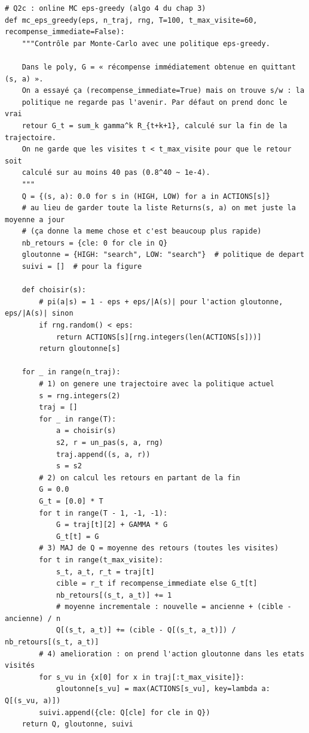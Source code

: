 \documentclass[11pt,a4paper]{article}
\begin{document}
\begin{lstlisting}[firstnumber=163]
# Q2c : online MC eps-greedy (algo 4 du chap 3)
def mc_eps_greedy(eps, n_traj, rng, T=100, t_max_visite=60, recompense_immediate=False):
    """Contrôle par Monte-Carlo avec une politique eps-greedy.

    Dans le poly, G = « récompense immédiatement obtenue en quittant (s, a) ».
    On a essayé ça (recompense_immediate=True) mais on trouve s/w : la
    politique ne regarde pas l'avenir. Par défaut on prend donc le vrai
    retour G_t = sum_k gamma^k R_{t+k+1}, calculé sur la fin de la trajectoire.
    On ne garde que les visites t < t_max_visite pour que le retour soit
    calculé sur au moins 40 pas (0.8^40 ~ 1e-4).
    """
    Q = {(s, a): 0.0 for s in (HIGH, LOW) for a in ACTIONS[s]}
    # au lieu de garder toute la liste Returns(s, a) on met juste la moyenne a jour
    # (ça donne la meme chose et c'est beaucoup plus rapide)
    nb_retours = {cle: 0 for cle in Q}
    gloutonne = {HIGH: "search", LOW: "search"}  # politique de depart
    suivi = []  # pour la figure

    def choisir(s):
        # pi(a|s) = 1 - eps + eps/|A(s)| pour l'action gloutonne, eps/|A(s)| sinon
        if rng.random() < eps:
            return ACTIONS[s][rng.integers(len(ACTIONS[s]))]
        return gloutonne[s]

    for _ in range(n_traj):
        # 1) on genere une trajectoire avec la politique actuel
        s = rng.integers(2)
        traj = []
        for _ in range(T):
            a = choisir(s)
            s2, r = un_pas(s, a, rng)
            traj.append((s, a, r))
            s = s2
        # 2) on calcul les retours en partant de la fin
        G = 0.0
        G_t = [0.0] * T
        for t in range(T - 1, -1, -1):
            G = traj[t][2] + GAMMA * G
            G_t[t] = G
        # 3) MAJ de Q = moyenne des retours (toutes les visites)
        for t in range(t_max_visite):
            s_t, a_t, r_t = traj[t]
            cible = r_t if recompense_immediate else G_t[t]
            nb_retours[(s_t, a_t)] += 1
            # moyenne incrementale : nouvelle = ancienne + (cible - ancienne) / n
            Q[(s_t, a_t)] += (cible - Q[(s_t, a_t)]) / nb_retours[(s_t, a_t)]
        # 4) amelioration : on prend l'action gloutonne dans les etats visités
        for s_vu in {x[0] for x in traj[:t_max_visite]}:
            gloutonne[s_vu] = max(ACTIONS[s_vu], key=lambda a: Q[(s_vu, a)])
        suivi.append({cle: Q[cle] for cle in Q})
    return Q, gloutonne, suivi
\end{lstlisting}
\end{document}
